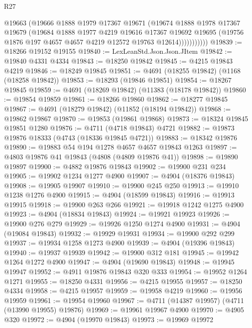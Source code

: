 \begin{lexlean}{R27}
\begin{coremodule}
                  @19663
                  (@19666
                    @1888
                    @1979
                    @17367
                    @19671
                    (@19674
                      @1888
                      @1978
                      @17367
                      @19679
                      (@19684
                        @1888
                        @1977
                        @4219
                        @19616
                        @17367
                        @19692
                        @19695
                        (@19756 @1876 @197 @4657 @4657 @4219 @12572 @19763 @12614)))))))))))
@19839 := @18266 @19152 @19155
@19840 := LexLeanStd.Json.Json.JItem
@19842 := @19840 @4331 @4334
@19843 := @18250 @19842
@19845 := @4215 @19843 @4219
@19846 := @18249 @19845
@19851 := @4691 (@18255 @19842) (@1168 (@18258 @19842))
@19853 := @18293 (@19846 @19851)
@19854 := @18267 @19845
@19859 := @4691 (@18269 @19842) (@11383 (@18178 @19842))
@19860 := @19854 @19859
@19861 := @18266 @19860
@19862 := @18277 @19845
@19867 := @4691 (@18279 @19842) (@11852 (@18194 @19842))
@19868 := @19862 @19867
@19870 := @19853 (@19861 @19868)
@19873 := @18324 @19845 @19851 @1280
@19876 := @4711 (@4718 @19843) @4721
@19882 := @19873 @19876 @18333 (@4743 (@18336 @19845 @4721))
@19883 := @18342 @19876
@19890 := @19883 @54 @194 @1278 @4657 @4657 @19843 @1263
@19897 := @4803 @19876 @41 @19843 (@4808 (@4809 @19876 @41))
@19898 := @19890 @19897
@19900 := @4882 @19876 @19843
@19902 := @19900 @231 @234
@19905 := @19902 @1234 @1277 @4900
@19907 := @4904 (@18376 @19843)
@19908 := @19905 @19907
@19910 := @19900 @245 @250
@19913 := @19910 @1238 @1276 @4900
@19915 := @4904 (@18599 @19843)
@19916 := @19913 @19915
@19918 := @19900 @263 @266
@19921 := @19918 @1242 @1275 @4900
@19923 := @4904 (@18834 @19843)
@19924 := @19921 @19923
@19926 := @19900 @276 @279
@19929 := @19926 @1250 @1274 @4900
@19931 := @4904 (@19084 @19843)
@19932 := @19929 @19931
@19934 := @19900 @292 @299
@19937 := @19934 @1258 @1273 @4900
@19939 := @4904 (@19396 @19843)
@19940 := @19937 @19939
@19942 := @19900 @312 @181
@19945 := @19942 @1264 @1272 @4900
@19947 := @4904 (@19690 @19843)
@19948 := @19945 @19947
@19952 := @4911 @19876 @19843 @320 @333
@19954 := @19952 @1264 @1271
@19955 := @18250 @4331
@19956 := @4215 @19955
@19957 := @18250 @4334
@19958 := @4215 @19957
@19959 := @19958 @4219
@19960 := @19956 @19959
@19961 := @19954 @19960
@19967 := @4711 (@14387 @19957) (@4711 (@13990 @19955) @19876)
@19969 := @19961 @19967 @4900
@19970 := @4905 @320
@19972 := @4904 (@19970 @19843)
@19973 := @19969 @19972

\end{coremodule}
\end{lexlean}
